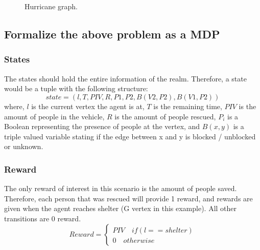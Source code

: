 \documentclass{article}                     %
\newcommand{\wrelation}[3][]
{
	\path [draw=blue, -] (#2) -- (#3) node[midway, anchor=south]{#1};
}
\newcommand{\mynode}[3][]{
	\node [draw, circle] (#1) at (#2, #3) {#1};
}
\begin{document}
	\section{}
	\begin{figure}[H]
		\centering
		\caption{Hurricane graph.}
		\label{fig:hurricane}
	\end{figure}

	\subsection{Formalize the above problem as a MDP}
	\subsubsection{States}
	The states should hold the entire information of the realm. Therefore, a state would be a tuple with the following structure:
	\begin{equation}\label{eq:state}
	 state = (l, T, PIV, R, P1, P2, B(V2, P2), B(V1, P2)) 
	\end{equation}
	where, $ l $ is the current vertex the agent is at, $ T $ is the remaining time, $ PIV $ is the amount of people in the vehicle, $ R $ is the amount of people rescued, $ P_i $ is a Boolean representing the presence of people at the vertex, and $ B(x, y) $ is a triple valued variable stating if the edge between x and y is blocked / unblocked or unknown.
	
	\subsubsection{Reward}
	The only reward of interest in this scenario is the amount of people saved. Therefore, each person that was rescued will provide 1 reward, and rewards are given when the agent reaches shelter (G vertex in this example). All other transitions are 0 reward. 
	\begin{equation}\label{key}
	Reward = \left\{ \begin{array}{c}
	PIV \quad if(l==shelter) \\
	0 \quad otherwise
	\end{array} \right.
	\end{equation}
	
\end{document}
